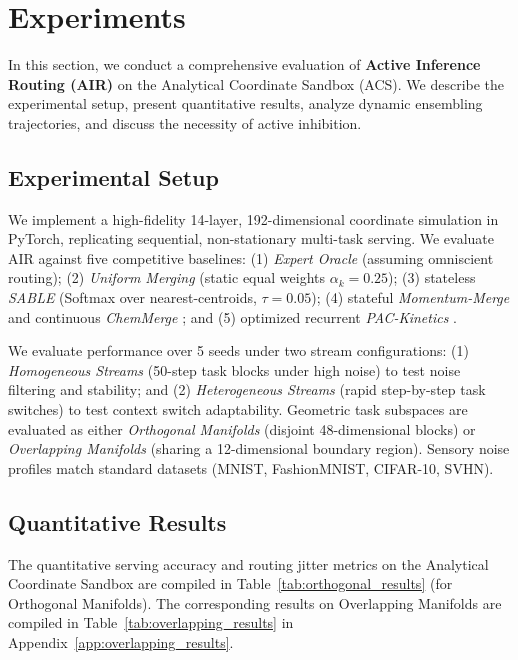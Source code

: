 \section{Experiments}
\label{sec:experiments}

In this section, we conduct a comprehensive evaluation of \textbf{Active Inference Routing (AIR)} on the Analytical Coordinate Sandbox (ACS). We describe the experimental setup, present quantitative results, analyze dynamic ensembling trajectories, and discuss the necessity of active inhibition.

\subsection{Experimental Setup}
We implement a high-fidelity 14-layer, 192-dimensional coordinate simulation in PyTorch, replicating sequential, non-stationary multi-task serving. We evaluate AIR against five competitive baselines: (1) \emph{Expert Oracle} (assuming omniscient routing); (2) \emph{Uniform Merging} (static equal weights $\alpha_k = 0.25$); (3) stateless \emph{SABLE} \cite{sable2024} (Softmax over nearest-centroids, $\tau = 0.05$); (4) stateful \emph{Momentum-Merge} \cite{momentummerge2025} and continuous \emph{ChemMerge} \cite{chemmerge2025}; and (5) optimized recurrent \emph{PAC-Kinetics} \cite{packinetics2025}. 

We evaluate performance over 5 seeds under two stream configurations: (1) \emph{Homogeneous Streams} (50-step task blocks under high noise) to test noise filtering and stability; and (2) \emph{Heterogeneous Streams} (rapid step-by-step task switches) to test context switch adaptability. Geometric task subspaces are evaluated as either \emph{Orthogonal Manifolds} (disjoint 48-dimensional blocks) or \emph{Overlapping Manifolds} (sharing a 12-dimensional boundary region). Sensory noise profiles match standard datasets (MNIST, FashionMNIST, CIFAR-10, SVHN).

\subsection{Quantitative Results}
The quantitative serving accuracy and routing jitter metrics on the Analytical Coordinate Sandbox are compiled in Table~\ref{tab:orthogonal_results} (for Orthogonal Manifolds). The corresponding results on Overlapping Manifolds are compiled in Table~\ref{tab:overlapping_results} in Appendix~\ref{app:overlapping_results}.

